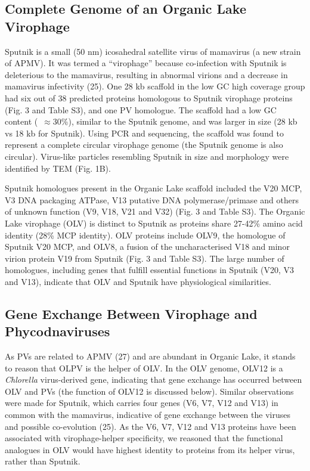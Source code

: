 \subsection{Complete Genome of an Organic Lake Virophage}
Sputnik is a small (50 nm) icosahedral satellite virus of mamavirus (a new strain of APMV). 
It was termed a ``virophage'' because co-infection with Sputnik is deleterious to the mamavirus, resulting in abnormal virions and a decrease in mamavirus infectivity (25). 
One 28 kb scaffold in the low GC high coverage group had six out of 38 predicted proteins homologous to Sputnik virophage proteins (Fig. 3 and Table S3), and one PV homologue. 
The scaffold had a low GC content (~$\approx$30\%), similar to the Sputnik genome, and was larger in size (28 kb vs 18 kb for Sputnik). 
Using PCR and sequencing, the scaffold was found to represent a complete circular virophage genome (the Sputnik genome is also circular). Virus-like particles resembling Sputnik in size and morphology were identified by TEM (Fig. 1B).

Sputnik homologues present in the Organic Lake scaffold included the V20 MCP, V3 DNA packaging ATPase, V13 putative DNA polymerase/primase and others of unknown function (V9, V18, V21 and V32) (Fig. 3 and Table S3). 
The Organic Lake virophage (OLV) is distinct to Sputnik as proteins share 27-42\% amino acid identity (28\% MCP identity). 
OLV proteins include OLV9, the homologue of Sputnik V20 MCP, and OLV8, a fusion of the uncharacterised V18 and minor virion protein V19 from Sputnik (Fig. 3 and Table S3). 
The large number of homologues, including genes that fulfill essential functions in Sputnik (V20, V3 and V13), indicate that OLV and Sputnik have physiological similarities. 

\subsection{Gene Exchange Between Virophage and Phycodnaviruses}

As PVs are related to APMV (27) and are abundant in Organic Lake, it stands to reason that OLPV is the helper of OLV. 
In the OLV genome, OLV12 is a \textit{Chlorella} virus-derived gene, indicating that gene exchange has occurred between OLV and PVs (the function of OLV12 is discussed below). 
Similar observations were made for Sputnik, which carries four genes (V6, V7, V12 and V13) in common with the mamavirus, indicative of gene exchange between the viruses and possible co-evolution (25). 
As the V6, V7, V12 and V13 proteins have been associated with virophage-helper specificity, we reasoned that the functional analogues in OLV would have highest identity to proteins from its helper virus, rather than Sputnik. 

